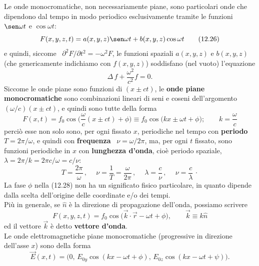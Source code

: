 Le onde monocromatiche, non necessariamente piane, sono particolari onde che
dipendono dal tempo in modo periodico esclusivamente tramite le funzioni
$\sen\omega t$ e $\cos\omega t$:
\begin{equation}
  F(x,y,z,t)=a(x,y,z)\sen\omega t+b(x,y,z)\cos\omega t
  \tag{12.26}
\end{equation}
e quindi, siccome \ $\partial^2F/\partial t^2=-\omega^2F$, le funzioni spaziali
$a(x,y,z)$ e $b(x,y,z)$ \big(che genericamente indichiamo con $f(x,y,z)$\big)
soddisfano (nel vuoto) l'equazione
\begin{equation}
  \Delta\,f+\frac{\omega^2}{c^2}f=0.
  \tag{12.27}
\end{equation}
Siccome le onde piane sono funzioni di $(x\pm ct)$, le \textbf{onde piane
monocromatiche} sono combinazioni lineari di seni e coseni dell'argomento
$(\omega/c)(x\pm ct)$, e quindi sono tutte della forma
\begin{equation}
  F(x,t)=f_0\cos\big(\frac{\omega}{c}(x\pm ct)+\phi\big)
  \equiv f_0\cos\big(kx\pm\omega t+\phi\big);\qquad k=\frac{\omega}{c}
  \tag{12.28}
\end{equation}
perci\`o esse non solo sono, per ogni fissato $x$, periodiche nel tempo con
\textbf{periodo} \ $T=2\pi/\omega$, e quindi con \textbf{frequenza}
\ $\nu=\omega/2\pi$, ma, per ogni $t$ fissato, sono funzioni periodiche in $x$
con \textbf{lunghezza d'onda}, cio\`e periodo spaziale,
\ $\lambda=2\pi/k=2\pi c/\omega=c/\nu$:
\begin{equation}
  T=\frac{2\pi}{\omega}\,,\quad\ \nu=\frac{1}{T}=\frac{\omega}{2\pi}\,,
  \quad\ \lambda=\frac{c}{\nu}\,,\quad\ \nu=\frac{c}{\lambda}\,\cdot
  \tag{12.29}
\end{equation}
La fase $\phi$ nella (12.28) non ha un significato fisico particolare, in quanto
dipende dalla scelta dell'origine delle coordinate e/o dei tempi.\\
Pi\`u in generale, se $\hat n$ \`e la direzione di propagazione dell'onda,
possiamo scrivere
\begin{equation}
  F(x,y,z,t)=f_0\cos\big(\vec k\cdot\vec r-\omega t+\phi\big),
  \qquad\vec k\equiv k\hat n
  \tag{12.30}
\end{equation}
ed il vettore $\vec k$ \`e detto \textbf{vettore d'onda}.\\
Le onde elettromagnetiche piane monocromatiche (progressive in direzione
dell'asse $x$) sono della forma
\begin{equation}
  \vec E(x,t)
  =\big(0,\,E_{0y}\cos(kx-\omega t+\phi),\,E_{0z}\cos(kx-\omega t+\psi)\big).
  \tag{12.31}
\end{equation}

